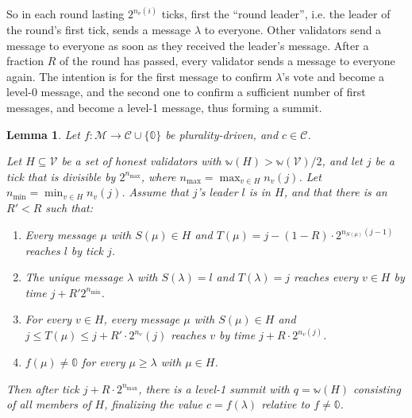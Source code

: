 \documentclass[12pt]{article}
\newtheorem{lemma}{Lemma}
\begin{document}
So in each round lasting $2^{n_v(i)}$ ticks, first the ``round leader'', i.e. the leader of the round's first tick, sends a message $\lambda$ to everyone. Other validators send a message to everyone as soon as they received the leader's message. After a fraction $R$ of the round has passed, every validator sends a message to everyone again. The intention is for the first message to confirm $\lambda$'s vote and become a level-0 message, and the second one to confirm a sufficient number of first messages, and become a level-1 message, thus forming a summit.

\begin{lemma}\label{basicLiveness}
  Let $f : \mathcal{M} \rightarrow \mathcal{C} \cup \{ \mathbb{0} \}$ be plurality-driven, and $c \in \mathcal{C}$.

  Let $H \subseteq \mathcal{V}$ be a set of honest validators with $\mathbb{w}(H) > \mathbb{w}(\mathcal{V}) / 2$, and let $j$ be a tick that is divisible by $2^{n_{\max}}$, where $n_{\max} = \max_{v \in H} n_v(j)$. Let $n_{\min} = \min_{v \in H} n_v(j)$. Assume that $j$'s leader $l$ is in $H$, and that there is an $R' < R$ such that:
  \begin{enumerate}
    \item Every message $\mu$ with $S(\mu) \in H$ and $T(\mu) = j - (1 - R) \cdot 2^{n_{S(\mu)}(j - 1)}$ reaches $l$ by tick $j$.
    \item The unique message $\lambda$ with $S(\lambda) = l$ and $T(\lambda) = j$ reaches every $v \in H$ by time $j + R' 2^{n_{\min}}$.
    \item For every $v \in H$, every message $\mu$ with $S(\mu) \in H$ and $j \leq T(\mu) \leq j + R' \cdot 2^{n_v}(j)$ reaches $v$ by time $j + R \cdot 2^{n_v(j)}$.
    \item $f(\mu) \neq \mathbb{0}$ for every $\mu \geq \lambda$ with $\mu \in H$.
  \end{enumerate}
  Then after tick $j + R \cdot 2^{n_{\max}}$, there is a level-1 summit with $q = \mathbb{w}(H)$ consisting of all members of $H$, finalizing the value $c = f(\lambda)$ relative to $f \neq \mathbb{0}$.
\end{lemma}
\end{document}
